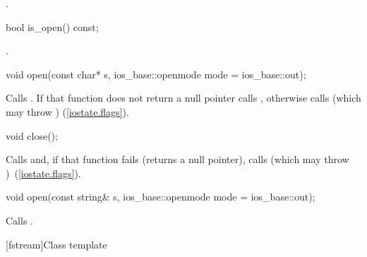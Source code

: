 \begin{itemdescr}
\pnum
\returns
{}.
\end{itemdescr}

%
\begin{itemdecl}
bool is_open() const;
\end{itemdecl}

\begin{itemdescr}
\pnum
\returns
{}.
\end{itemdescr}

%
\begin{itemdecl}
void open(const char* s, ios_base::openmode mode = ios_base::out);
\end{itemdecl}

\begin{itemdescr}
\pnum
\effects
Calls
.
If that function does not return a null pointer
calls ,
otherwise calls
(which may throw
) (\ref{iostate.flags}).
\end{itemdescr}

%
\begin{itemdecl}
void close();
\end{itemdecl}

\begin{itemdescr}
\pnum
\effects
Calls
and, if that function fails (returns a null pointer), calls
(which may throw
)~(\ref{iostate.flags}).
\end{itemdescr}

%
\begin{itemdecl}
void open(const string& s, ios_base::openmode mode = ios_base::out);
\end{itemdecl}

\begin{itemdescr}
\pnum
\effects Calls .
\end{itemdescr}

[fstream]{Class template }


